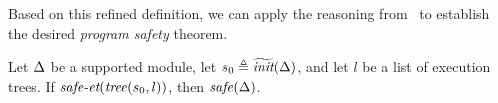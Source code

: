 {%


Based on this refined definition,
we can apply the reasoning from~ to establish the desired \emph{program safety} theorem.

\begin{theorem}
\label{theorem:safety-via-et}
Let $\Delta$ be a supported module, let $s_0 \triangleq \widetilde{\textit{init}}(\Delta)$, and let $l$ be a list of execution trees.
If $\textit{safe-et}(\mathit{tree}(s_0, l))$, then $\mathit{safe}(\Delta)$.
\end{theorem}
}
